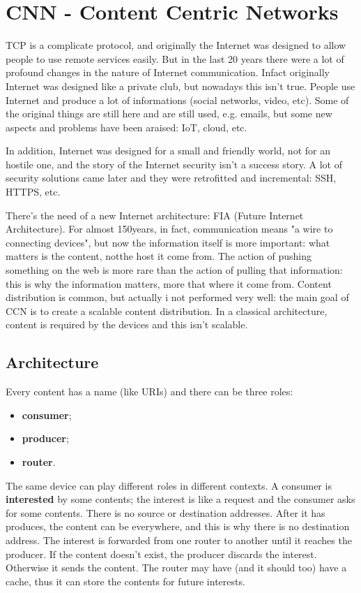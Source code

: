 \section{CNN - Content Centric Networks}
TCP is a complicate protocol, and originally the Internet was designed to allow people to use remote services easily. But in the last 20 years there were a lot of profound changes in the nature of Internet communication. Infact originally Internet was designed like a private club, but nowadays this isn't true. People use Internet and produce a lot of informations (social networks, video, etc). Some of the original things are still here and are still used, e.g. emails, but some new aspects and problems have been araised: IoT, cloud, etc.

In addition, Internet was designed for a small and friendly world, not for an hostile one, and the story of the Internet security isn't a success story. A lot of security solutions came later and they were retrofitted and incremental: SSH, HTTPS, etc.

There's the need of a new Internet architecture: FIA (Future Internet Architecture). For almost 150years, in fact, communication means "a wire to connecting devices", but now the information itself is more important: what matters is the content, notthe host it come from. The action of pushing something on the web is more rare than the action of pulling that information: this is why the information matters, more that where it come from. Content distribution is common, but actually i not performed very well: the main goal of CCN is to create a scalable content distribution. In a classical architecture, content is required by the devices and this isn't scalable.

\subsection{Architecture}
Every content has a name (like URIs) and there can be three roles:
\begin{itemize}
  \item \textbf{consumer};
  \item \textbf{producer};
  \item \textbf{router}.
\end{itemize}
The same device can play different roles in different contexts. A consumer is \textbf{interested} by some contents; the interest is like a request and the consumer asks for some contents. There is no source or destination addresses. After it has produces, the content can be everywhere, and this is why there is no destination address. The interest is forwarded from one router to another until it reaches the producer. If the content doesn't exist, the producer discards the interest. Otherwise it sends the content. The router may have (and it should too) have a cache, thus it can store the contents for future interests.

